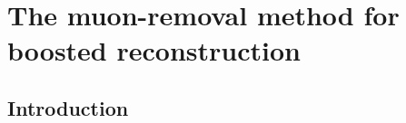\chapter{The muon-removal method for boosted \tmth reconstruction}

\graphicspath{{1_MainChapters/Chap5_MuonRM/fig}}


\section{Introduction} \label{sec:intro}


